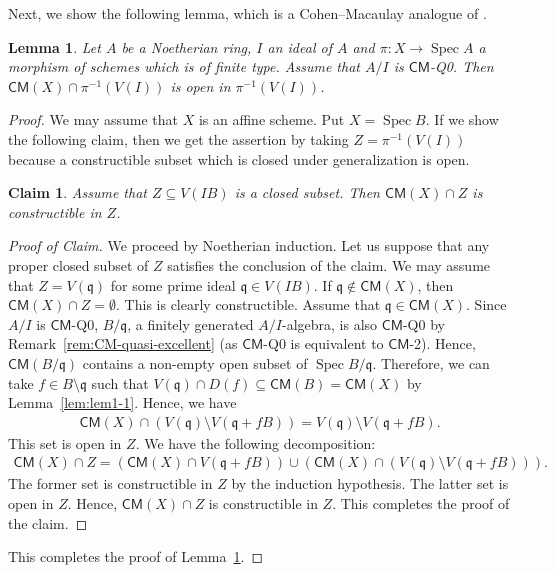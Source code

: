 \documentclass[a4paper, 11pt]{amsart}
\newtheorem{lemma}[theorem]{Lemma}
\newtheorem{claim}[theorem]{Claim}
\theoremstyle{definition}
\newenvironment{pfclaim}
    {\renewcommand{\qedsymbol}{$\Diamond$}\begin{proof}[Proof of Claim]}
    {\end{proof}}
\newcommand{\Spec}{\operatorname{Spec}}
\let\subset\subseteq
\begin{document}
Next, we show the following lemma, which is a Cohen--Macaulay analogue of \cite[Lemma~4.2]{KS21}. 

\begin{lemma}\label{lem:lem1-2}
    Let $A$ be a Noetherian ring, $I$ an ideal of $A$ and $\pi \colon X \to \Spec A$ a morphism of schemes which is of finite type. Assume that $A/I$ is $\mathsf{CM}$\textup{-Q0}. Then $\mathsf{CM}(X) \cap \pi^{-1}(V(I))$ is open in $\pi^{-1}(V(I))$.
\end{lemma}
\begin{proof}
    We may assume that $X$ is an affine scheme. Put $X = \Spec B$. If we show the following claim, then we get the assertion by taking $Z = \pi^{-1}(V(I))$ because a constructible subset which is closed under generalization is open.
    \begin{claim}\label{claim:claim1}
        Assume that $Z \subset V(IB)$ is a closed subset. Then $\mathsf{CM}(X) \cap Z$ is constructible in $Z$.
    \end{claim}
    \begin{pfclaim}
        We proceed by Noetherian induction. Let us suppose that any proper closed subset of $Z$ satisfies the conclusion of the claim. We may assume that $Z = V(\mathfrak{q})$ for some prime ideal $\mathfrak{q} \in V(IB)$. If $\mathfrak{q} \notin \mathsf{CM}(X)$, then $\mathsf{CM}(X) \cap Z = \emptyset$. This is clearly constructible. Assume that $\mathfrak{q} \in \mathsf{CM}(X)$. Since $A/I$ is $\mathsf{CM}$-Q0, $B/\mathfrak{q}$, a finitely generated $A/I$-algebra, is also $\mathsf{CM}$-Q0 by Remark~\ref{rem:CM-quasi-excellent} (as $\mathsf{CM}$-Q0 is equivalent to $\mathsf{CM}$-2). Hence, $\mathsf{CM}(B/\mathfrak{q})$ contains a non-empty open subset of $\Spec B/\mathfrak{q}$. Therefore, we can take $f \in B \setminus \mathfrak{q}$ such that $V(\mathfrak{q}) \cap D(f) \subset \mathsf{CM}(B) = \mathsf{CM}(X)$ by Lemma~\ref{lem:lem1-1}. Hence, we have
        \begin{align*}
            \mathsf{CM}(X) \cap (V(\mathfrak{q}) \setminus V(\mathfrak{q} + fB)) = V(\mathfrak{q}) \setminus V(\mathfrak{q} + fB).
        \end{align*}
        This set is open in $Z$. We have the following decomposition:
        \begin{align*}
            \mathsf{CM}(X) \cap Z = \left( \mathsf{CM}(X) \cap V(\mathfrak{q} + fB) \right) \cup \left( \mathsf{CM}(X) \cap (V(\mathfrak{q}) \setminus V(\mathfrak{q} + fB)) \right). 
        \end{align*}
        The former set is constructible in $Z$ by the induction hypothesis. The latter set is open in $Z$. Hence, $\mathsf{CM}(X) \cap Z$ is constructible in $Z$. This completes the proof of the claim.
    \end{pfclaim}
    This completes the proof of Lemma~\ref{lem:lem1-2}.
\end{proof}
\end{document}
